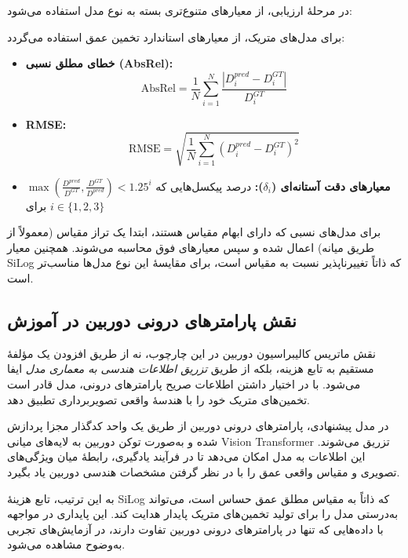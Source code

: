 در مرحلهٔ ارزیابی، از معیارهای متنوع‌تری بسته به نوع مدل استفاده می‌شود:

برای مدل‌های متریک، از معیارهای استاندارد تخمین عمق استفاده می‌گردد:
\begin{itemize}
    \item \textbf{خطای مطلق نسبی (AbsRel):} 
    \begin{equation}
    \text{AbsRel} = \frac{1}{N}\sum_{i=1}^{N} \frac{|D_i^{pred} - D_i^{GT}|}{D_i^{GT}}
    \end{equation}
    
    \item \textbf{RMSE:}
    \begin{equation}
    \text{RMSE} = \sqrt{\frac{1}{N}\sum_{i=1}^{N} (D_i^{pred} - D_i^{GT})^2}
    \end{equation}
    
    \item \textbf{معیارهای دقت آستانه‌ای ($\delta_i$):} درصد پیکسل‌هایی که $\max\left(\frac{D^{pred}}{D^{GT}}, \frac{D^{GT}}{D^{pred}}\right) < 1.25^i$ برای $i \in \{1, 2, 3\}$
\end{itemize}

برای مدل‌های نسبی که دارای ابهام مقیاس هستند، ابتدا یک تراز مقیاس (معمولاً از طریق میانه) اعمال شده و سپس معیارهای فوق محاسبه می‌شوند. همچنین معیار SiLog که ذاتاً تغییرناپذیر نسبت به مقیاس است، برای مقایسهٔ این نوع مدل‌ها مناسب‌تر است.

\subsection{نقش پارامترهای درونی دوربین در آموزش}

نقش ماتریس کالیبراسیون دوربین در این چارچوب، نه از طریق افزودن یک مؤلفهٔ مستقیم به تابع هزینه، بلکه از طریق \emph{تزریق اطلاعات هندسی به معماری مدل} ایفا می‌شود. با در اختیار داشتن اطلاعات صریح پارامترهای درونی، مدل قادر است تخمین‌های متریک خود را با هندسهٔ واقعی تصویربرداری تطبیق دهد.

در مدل پیشنهادی، پارامترهای درونی دوربین از طریق یک واحد کدگذار مجزا پردازش شده و به‌صورت توکن دوربین به لایه‌های میانی Vision Transformer تزریق می‌شوند. این اطلاعات به مدل امکان می‌دهد تا در فرآیند یادگیری، رابطهٔ میان ویژگی‌های تصویری و مقیاس واقعی عمق را با در نظر گرفتن مشخصات هندسی دوربین یاد بگیرد.

به این ترتیب، تابع هزینهٔ SiLog که ذاتاً به مقیاس مطلق عمق حساس است، می‌تواند به‌درستی مدل را برای تولید تخمین‌های متریک پایدار هدایت کند. این پایداری در مواجهه با داده‌هایی که تنها در پارامترهای درونی دوربین تفاوت دارند، در آزمایش‌های تجربی به‌وضوح مشاهده می‌شود.

